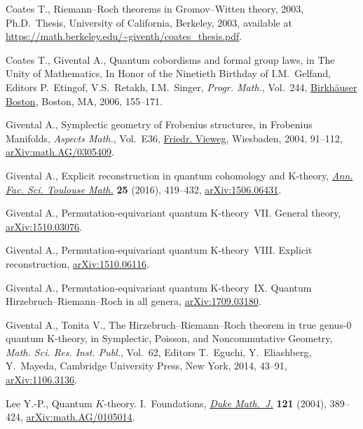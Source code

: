 \documentclass[pdftex]{sigma}
\begin{document}
\vspace{-2mm}

\begin{thebibliography}{99}
\footnotesize\itemsep=-1.5pt

Coates T., Riemann--{R}och theorems in {G}romov--{W}itten theory, 2003, Ph.D.~Thesis, {U}niversity of California, Berkeley, 2003, available at
 \url{https://math.berkeley.edu/~giventh/coates_thesis.pdf}.

Coates T., Givental A., Quantum cobordisms and formal group laws, in The Unity
 of Mathematics, In Honor of the Ninetieth Birthday of I.M.~Gelfand, Editors P.~Etingof, V.S.~Retakh, I.M.~Singer, \textit{Progr. Math.}, Vol.~244, \href{https://doi.org/10.1007/0-8176-4467-9_4}{Birkh\"{a}user Boston}, Boston, MA, 2006, 155--171.

Givental A., Symplectic geometry of {F}robenius structures, in Frobenius
 Manifolds, \textit{Aspects Math.}, Vol.~E36, \href{https://doi.org/10.1007/978-3-322-80236-1_4}{Friedr. Vieweg}, Wiesbaden, 2004,
 91--112, \href{https://arxiv.org/abs/math.AG/0305409}{arXiv:math.AG/0305409}.

Givental A., Explicit reconstruction in quantum cohomology and {K}-theory,
 \href{https://doi.org/10.5802/afst.1500}{\textit{Ann. Fac. Sci. Toulouse Math.}} \textbf{25} (2016), 419--432, \href{https://arxiv.org/abs/1506.06431}{arXiv:1506.06431}.

Givental A., Permutation-equivariant quantum {K}-theory~{VII}. {G}eneral
 theory, \href{https://arxiv.org/abs/1510.03076}{arXiv:1510.03076}.

Givental A., Permutation-equivariant quantum {K}-theory~{VIII}. {E}xplicit
 reconstruction, \href{https://arxiv.org/abs/1510.06116}{arXiv:1510.06116}.

Givental A., Permutation-equivariant quantum {K}-theory~{IX}. {Q}uantum
 {H}irzebruch--{R}iemann--{R}och in all genera, \href{https://arxiv.org/abs/1709.03180}{arXiv:1709.03180}.

Givental A., Tonita V., The {H}irzebruch--{R}iemann--{R}och theorem in true
 genus-0 quantum {K}-theory, in Symplectic, {P}oisson, and Noncommutative
 Geometry, \textit{Math. Sci. Res. Inst. Publ.}, Vol.~62, Editors T.~Eguchi,
 Y.~Eliashberg, Y.~Mayeda, Cambridge University Press, New York, 2014, 43--91,
 \href{https://arxiv.org/abs/1106.3136}{arXiv:1106.3136}.

Lee Y.-P., Quantum {$K$}-theory. {I}.~{F}oundations, \href{https://doi.org/10.1215/S0012-7094-04-12131-1}{\textit{Duke Math.~J.}}
 \textbf{121} (2004), 389--424, \href{https://arxiv.org/abs/math.AG/0105014}{arXiv:math.AG/0105014}.

\end{thebibliography}\LastPageEnding
\end{document}
